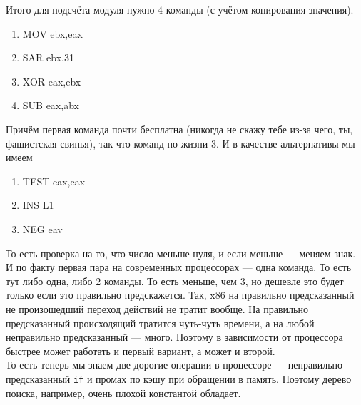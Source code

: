 \documentclass{article}
\begin{document}
    Итого для подсчёта модуля нужно 4 команды (с учётом копирования значения).
    \begin{enumerate}
        \item MOV ebx,eax
        \item SAR ebx,31
        \item XOR eax,ebx
        \item SUB eax,abx
    \end{enumerate}
    Причём первая команда почти бесплатна (никогда не скажу тебе из-за чего, ты, фашистская свинья), так что команд по жизни 3. И в качестве альтернативы мы имеем
    \begin{enumerate}
        \item TEST eax,eax
        \item INS L1
        \item NEG eav
    \end{enumerate}
    То есть проверка на то, что число меньше нуля, и если меньше --- меняем знак. И по факту первая пара на современных процессорах --- одна команда. То есть тут либо одна, либо 2 команды. То есть меньше, чем 3, но дешевле это будет только если это правильно предскажется. Так, x86 на правильно предсказанный не произошедший переход действий не тратит вообще. На правильно предсказанный происходящий тратится чуть-чуть времени, а на любой неправильно предсказанный --- много. Поэтому в зависимости от процессора быстрее может работать и первый вариант, а может и второй.\\
    То есть теперь мы знаем две дорогие операции в процессоре --- неправильно предсказанный \texttt{if} и промах по кэшу при обращении в память. Поэтому дерево поиска, например, очень плохой константой обладает.
\end{document}
